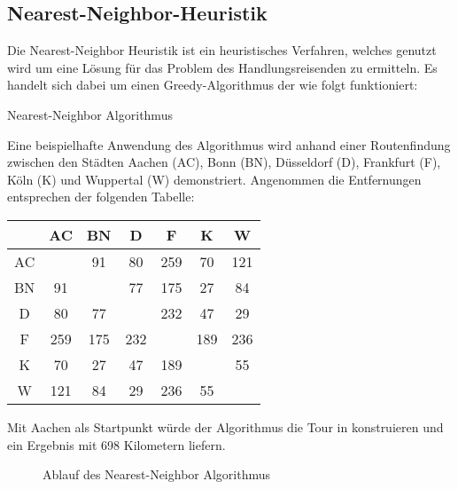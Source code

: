 \documentclass{article}
\begin{document}
\subsection{Nearest-Neighbor-Heuristik}
Die Nearest-Neighbor Heuristik ist ein heuristisches Verfahren, welches genutzt wird um eine Lösung für das Problem des Handlungsreisenden zu ermitteln. Es handelt sich dabei um einen Greedy-Algorithmus der wie folgt funktioniert:
\begin{algorithm}
\caption{Nearest-Neighbor Algorithmus}
\end{algorithm}

Eine beispielhafte Anwendung des Algorithmus wird anhand einer Routenfindung zwischen den Städten Aachen (AC), Bonn (BN), Düsseldorf (D), Frankfurt (F), Köln (K) und Wuppertal (W) demonstriert. Angenommen die Entfernungen entsprechen der folgenden Tabelle:
\begin{table}
\centering
\label{tbl:opt-struktur-select-reduktion}
\begin{tabular}{ |c|c|c|c|c|c|c| }
\hline
 & AC & BN & D& F & K & W \\ 
\hline
AC &  & 91 & 80 & 259 & 70 & 121 \\ 
\hline
BN & 91 &  & 77 & 175 & 27 & 84 \\ 
\hline
D & 80 & 77 &  & 232 & 47 & 29 \\ 
\hline
F & 259 & 175 & 232 &  & 189 & 236 \\ 
\hline
K & 70 & 27 & 47 & 189 &  & 55 \\ 
\hline
W & 121 & 84 & 29 & 236 & 55 &  \\ 
\hline
\end{tabular}
\end{table}
Mit Aachen als Startpunkt würde der Algorithmus die Tour in  konstruieren und ein Ergebnis mit 698 Kilometern liefern.
\begin{figure}[H]
\centering
{}
\caption{Ablauf des Nearest-Neighbor Algorithmus}
\label{fig:nearest-neighbor-beispiel}
\end{figure}
\end{document}
